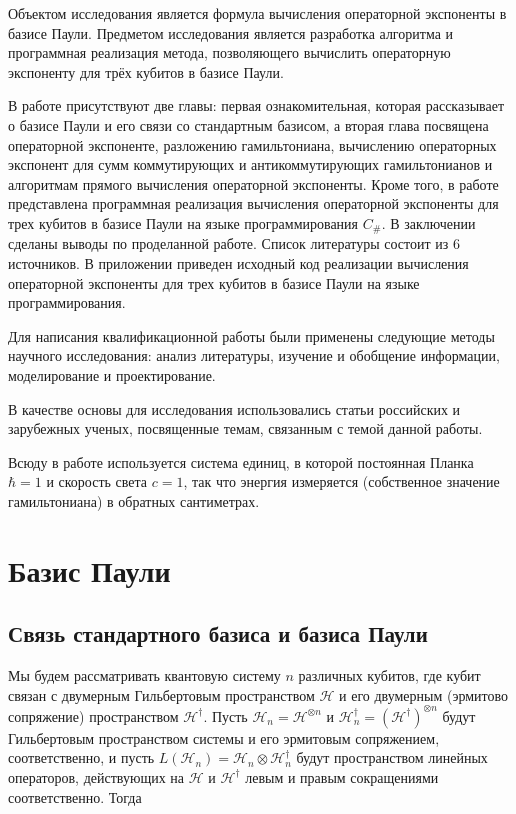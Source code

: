 \documentclass[a4paper]{report}
\begin{document}
Объектом исследования является формула вычисления операторной экспоненты в базисе Паули. Предметом исследования является разработка алгоритма и программная реализация метода, позволяющего вычислить операторную экспоненту для трёх кубитов в базисе Паули.

В работе присутствуют две главы: первая ознакомительная, которая рассказывает о базисе Паули и его связи со стандартным базисом, а вторая глава посвящена операторной экспоненте, разложению гамильтониана, вычислению операторных экспонент для сумм коммутирующих и антикоммутирующих гамильтонианов и алгоритмам прямого вычисления операторной экспоненты. Кроме того, в работе представлена программная реализация вычисления операторной экспоненты для трех кубитов в базисе Паули на языке программирования $C_{\#}$. В заключении сделаны выводы по проделанной работе. Список литературы состоит из 6 источников. В приложении приведен исходный код реализации вычисления операторной экспоненты для трех кубитов в базисе Паули на языке программирования.

Для написания квалификационной работы были применены следующие методы научного исследования: анализ литературы, изучение и обобщение информации, моделирование и проектирование.

В качестве основы для исследования использовались статьи российских и зарубежных ученых, посвященные темам, связанным с темой данной работы.

Всюду в работе используется система единиц, в которой постоянная Планка $\hbar = 1$ и скорость света $c = 1$, так что энергия измеряется (собственное значение гамильтониана) в обратных сантиметрах.


\chapter{Базис Паули}


\section{Связь стандартного базиса и базиса \mbox{Паули}}

Мы будем рассматривать квантовую систему ${n}$ различных кубитов, где кубит связан с двумерным Гильбертовым пространством ${\mathcal{H}}$ и его двумерным (эрмитово сопряжение) пространством ${\mathcal{H}^\dagger}$. Пусть ${\mathcal{H}_n = \mathcal{H}^{\otimes n}}$ и ${\mathcal{H}_n^\dagger = {(\mathcal{H}^\dagger)}^{\otimes n}}$ будут Гильбертовым пространством системы и его эрмитовым сопряжением, соответственно, и пусть ${L(\mathcal{H}_n) = \mathcal{H}_n \otimes \mathcal{H}^\dagger_n}$ будут пространством линейных операторов, действующих на ${\mathcal{H}}$ и ${\mathcal{H}^\dagger}$ левым и правым сокращениями соответственно. Тогда
\end{document}

